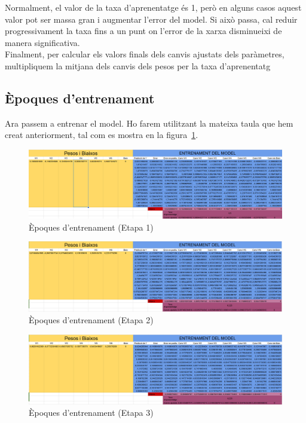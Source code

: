 Normalment, el valor de la taxa d’aprenentatge és 1, però en alguns casos aquest valor pot ser massa gran i augmentar l’error del model. Si això passa, cal reduir progressivament la taxa fins a un punt on l’error de la xarxa disminueixi de manera significativa.\\

Finalment, per calcular els valors finals dels canvis ajustats dels paràmetres, multipliquem la mitjana dels canvis dels pesos per la taxa d’aprenentatg\\
\vspace{-1.8truecm}
\subsection{Èpoques d'entrenament}
Ara passem a entrenar el model. Ho farem utilitzant la mateixa taula que hem creat anteriorment, tal com es mostra en la figura~\ref{f:entrenament}.

\begin{figure}[H]
    \centering
    \includegraphics[width=1\textwidth]{./figures/Etapa1.png}
    \caption{Èpoques d'entrenament (Etapa 1)}
    \label{f:entrenament}
\end{figure}

\begin{figure}[H]
    \centering
    \includegraphics[width=1\textwidth]{./figures/Etapa2.png}
    \caption{Èpoques d'entrenament (Etapa 2)}
\end{figure}

\begin{figure}[H]
    \centering
    \includegraphics[width=1\textwidth]{./figures/Etapa3.png}
    \caption{Èpoques d'entrenament (Etapa 3)}
\end{figure}

